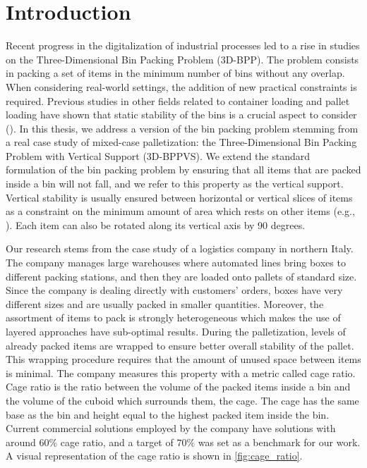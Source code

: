 \documentclass[11pt,a4paper,twocolumn]{article}
\begin{document}
\section{Introduction}
\label{sec:introduction}

Recent progress in the digitalization of industrial processes led to a rise in studies on the Three-Dimensional Bin Packing Problem (3D-BPP).
The problem consists in packing a set of items in the minimum number of bins without any overlap.
When considering real-world settings, the addition of new practical constraints is required.
Previous studies in other fields related to container loading and pallet loading have shown that static stability of the bins is a crucial aspect to consider (\cite{BORTFELDT20131}).
In this thesis, we address a version of the bin packing problem stemming from a real case study of mixed-case palletization: the Three-Dimensional Bin Packing Problem with Vertical Support (3D-BPPVS).
We extend the standard formulation of the bin packing problem by ensuring that all items that are packed inside a bin will not fall, and we refer to this property as the vertical support.
Vertical stability is usually ensured between horizontal or vertical slices of items as a constraint on the minimum amount of area which rests on other items (e.g., \cite{GZARA20201062,paquay2016mixed}).
Each item can also be rotated along its vertical axis by 90 degrees.

Our research stems from the case study of a logistics company in northern Italy.
The company manages large warehouses where automated lines bring boxes to different packing stations, and then they are loaded onto pallets of standard size.
Since the company is dealing directly with customers' orders, boxes have very different sizes and are usually packed in smaller quantities.
Moreover, the assortment of items to pack is strongly heterogeneous which makes the use of layered approaches have sub-optimal results.
During the palletization, levels of already packed items are wrapped to ensure better overall stability of the pallet.
This wrapping procedure requires that the amount of unused space between items is minimal.
The company measures this property with a metric called cage ratio.
Cage ratio is the ratio between the volume of the packed items inside a bin and the volume of the cuboid which surrounds them, the cage.
The cage has the same base as the bin and height equal to the highest packed item inside the bin.
Current commercial solutions employed by the company have solutions with around $60\%$ cage ratio, and a target of $70\%$ was set as a benchmark for our work.
A visual representation of the cage ratio is shown in \cref{fig:cage_ratio}.
\end{document}
